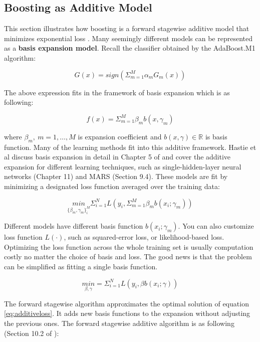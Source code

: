 \documentclass[12pt,]{krantz}
\begin{document}
\hypertarget{boosting-as-additive-model}{%
\subsection{Boosting as Additive Model}\label{boosting-as-additive-model}}

This section illustrates how boosting is a forward stagewise additive model that minimizes exponential loss \citep{Friedman2000}. Many seemingly different models can be represented as a \textbf{basis expansion model}. Recall the classifier obtained by the AdaBoost.M1 algorithm:

\[G(x)=sign ( \Sigma_{m=1}^M \alpha_{m}G_m(x))\]

The above expression fits in the framework of basis expansion which is as following:

\begin{equation}
f(x)=\Sigma_{m=1}^M \beta_m b(x,\gamma_m)
\label{eq:basisexp}
\end{equation}

where \(\beta_m,\ m=1,\dots,M\) is expansion coefficient and \(b(x,\gamma)\in \mathbb{R}\) is basis function. Many of the learning methods fit into this additive framework. Hastie et al discuss basis expansion in detail in Chapter 5 of \citet{Hastie2008} and cover the additive expansion for different learning techniques, such as single-hidden-layer neural networks (Chapter 11) and MARS (Section 9.4). These models are fit by minimizing a designated loss function averaged over the training data:

\begin{equation}
\underset{\{\beta_m,\gamma_m\}_i^M}{min}\Sigma_{i=1}^N L\left(y_i,\Sigma_{m=1}^M\beta_{m}b(x_i;\gamma_m)\right)
\label{eq:additiveloss}
\end{equation}

Different models have different basis function \(b(x_i;\gamma_m)\). You can also customize loss function \(L(\cdot)\), such as squared-error loss, or likelihood-based loss. Optimizing the loss function across the whole training set is usually computation costly no matter the choice of basis and loss. The good news is that the problem can be simplified as fitting a single basis function.

\[\underset{\beta,\gamma}{min}=\Sigma_{i=1}^N L(y_i,\beta b(x_i;\gamma))\]

The forward stagewise algorithm approximates the optimal solution of equation \eqref{eq:additiveloss}. It adds new basis functions to the expansion without adjusting the previous ones. The forward stagewise additive algorithm is as following (Section 10.2 of \citet{Hastie2008}):
\end{document}
